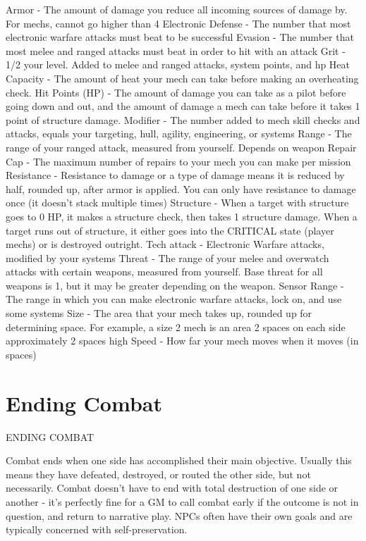 Armor - The amount of damage you reduce all incoming sources of damage by. For mechs,  
cannot go higher than 4  
Electronic Defense - The number that most electronic warfare attacks must beat to be  
successful  
Evasion - The number that most melee and ranged attacks must beat in order to hit with an  
attack  
Grit - 1/2 your level. Added to melee and ranged attacks, system points, and hp  
Heat Capacity - The amount of heat your mech can take before making an overheating check.  
Hit Points (HP) - The amount of damage you can take as a pilot before going down and out, and  
the amount of damage a mech can take before it takes 1 point of structure damage.  
Modifier - The number added to mech skill checks and attacks, equals your targeting, hull, agility,  
engineering, or systems  
Range - The range of your ranged attack, measured from yourself. Depends on weapon  
Repair Cap - The maximum number of repairs to your mech you can make per mission  
Resistance - Resistance to damage or a type of damage means it is reduced by half, rounded up,  
after armor is applied. You can only have resistance to damage once (it doesn’t stack multiple  
times)  
Structure - When a target with structure goes to 0 HP, it makes a structure check, then takes 1  
structure damage. When a target runs out of structure, it either goes into the CRITICAL state  
(player mechs) or is destroyed outright.  
Tech attack - Electronic Warfare attacks, modified by your systems  
Threat - The range of your melee and overwatch attacks with certain weapons, measured from  
yourself. Base threat for all weapons is 1, but it may be greater depending on the weapon.  
Sensor Range - The range in which you can make electronic warfare attacks, lock on, and use  
some systems  
Size - The area that your mech takes up, rounded up for determining space. For example, a size  
2 mech is an area 2 spaces on each side approximately 2 spaces high  
Speed - How far your mech moves when it moves (in spaces)  

                                                                                                              
\chapter{Ending Combat}

                                           ENDING COMBAT
 

Combat ends when one side has accomplished their main objective. Usually this means they  
have defeated, destroyed, or routed the other side, but not necessarily. Combat doesn’t have to  
end with total destruction of one side or another - it’s perfectly fine for a GM to call combat early  
if the outcome is not in question, and return to narrative play. NPCs often have their own goals  
and are typically concerned with self-preservation.
